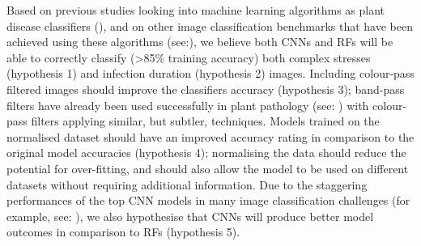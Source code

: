 \documentclass[../../Paper.tex]{subfiles}
\begin{document}
    Based on previous studies looking into machine learning algorithms as plant disease classifiers (\cite{awate_fruit_2015,baranowski_hyperspectral_2015,sladojevic_deep_2016,singh_detection_2017,ubbens_deep_2017}), and on other image classification benchmarks that have been achieved using these algorithms (see:\cite{krizhevsky_imagenet_2012}), we believe both CNNs and RFs will be able to correctly classify (\textgreater 85\% training accuracy) both complex stresses (hypothesis 1) and infection duration (hypothesis 2) images. Including colour-pass filtered images should improve the classifiers accuracy (hypothesis 3); band-pass filters have already been used successfully in plant pathology (see: \cite{piron_selection_2008}) with colour-pass filters applying similar, but subtler, techniques. Models trained on the normalised dataset should have an improved accuracy rating in comparison to the original model accuracies (hypothesis 4); normalising the data should reduce the potential for over-fitting, and should also allow the model to be used on different datasets without requiring additional information. Due to the staggering performances of the top CNN models in many image classification challenges (for example, see: \cite{krizhevsky_imagenet_2012}), we also hypothesise that CNNs will produce better model outcomes in comparison to RFs (hypothesis 5).
    
\pagebreak    
  
\end{document}

